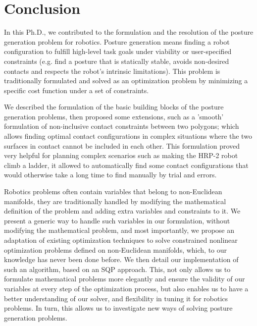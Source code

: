 

\chapter*{Conclusion}
\label{cha:conclusion}

In this Ph.D., we contributed to the formulation and the resolution of the posture generation problem for robotics.
Posture generation means finding a robot configuration to fulfill high-level task goals under viability or user-specified constraints (e.g. find a posture that is statically stable, avoids non-desired contacts and respects the robot's intrinsic limitations).
This problem is traditionally formulated and solved as an optimization problem by minimizing a specific cost function under a set of constraints.

We described the formulation of the basic building blocks of the posture generation problems, then proposed some extensions, such as a 'smooth' formulation of non-inclusive contact constraints between two polygons; which allows finding optimal contact configurations in complex situations where the two surfaces in contact cannot be included in each other.
This formulation proved very helpful for planning complex scenarios such as making the HRP-2 robot climb a ladder, it allowed to automatically find some contact configurations that would otherwise take a long time to find manually by trial and errors.

Robotics problems often contain variables that belong to non-Euclidean manifolds, they are traditionally handled by modifying the mathematical definition of the problem and adding extra variables and constraints to it.
We present a generic way to handle such variables in our formulation, without modifying the mathematical problem, and most importantly, we propose an adaptation of existing optimization techniques to solve constrained nonlinear optimization problems defined on non-Euclidean manifolds, which, to our knowledge has never been done before.
We then detail our implementation of such an algorithm, based on an SQP approach.
This, not only allows us to formulate mathematical problems more elegantly and ensure the validity of our variables at every step of the optimization process, but also enables us to have a better understanding of our solver, and flexibility in tuning it for robotics problems.
In turn, this allows us to investigate new ways of solving posture generation problems.

